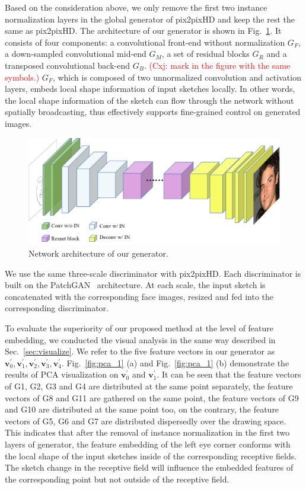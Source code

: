 \documentclass[10pt,twocolumn,letterpaper]{article}
\newcommand{\cxj}[1]{\textcolor{red}{(Cxj: #1)}}
\begin{document}
Based on the consideration above, we only remove the first two instance normalization layers in the global generator of pix2pixHD and keep the rest the same as pix2pixHD. 
The architecture of our generator is shown in Fig.~\ref{fig:our_generator}. 
It consists of four components: a convolutional front-end without normalization $G_F$, a down-sampled convolutional mid-end $G_M$, a set of residual blocks $G_R$ and a transposed convolutional back-end $G_B$. 
\cxj{mark in the figure with the same symbols.}
$G_F$, which is composed of two unnormalized convolution and activation layers,  embeds local shape information of input sketches locally.
In other words, the local shape information of the sketch can flow through the network without spatially broadcasting, thus effectively supports fine-grained control on generated images. 

\begin{figure}[htbp]
	\centering
	\includegraphics[width=\columnwidth]{our_model_G.png}
	\caption{Network architecture of our generator. }
	\label{fig:our_generator}
\end{figure}

We use the same three-scale discriminator with pix2pixHD. 
Each discriminator is built on the PatchGAN~\cite{pix2pix} architecture. 
At each scale, the input sketch is concatenated with the corresponding face images, resized and fed into the corresponding discriminator.
 
 
To evaluate the superiority of our proposed method at the level of feature embedding, we conducted the visual analysis in the same way described in Sec.~\ref{sec:visualize}.
%
We refer to the five feature vectors in our generator as $\boldsymbol{v}_0^{'},\boldsymbol{v}_1^{'},\boldsymbol{v}_2^{'},\boldsymbol{v}_3^{'},\boldsymbol{v}_4^{'}$.
%
Fig.~\ref{fig:pca_1} (a) and Fig.~\ref{fig:pca_1} (b) demonstrate the results of PCA visualization on $\boldsymbol{v}_0^{'}$ and $\boldsymbol{v}_1^{'}$. 
It can be seen that the feature vectors of G1, G2, G3 and G4 are distributed at the same point separately, the feature vectors of G8 and G11 are gathered on the same point, the feature vectors of G9 and G10 are distributed at the same point too, on the contrary, the feature vectors of G5, G6 and G7 are distributed dispersedly over the drawing space. 
This indicates that after the removal of instance normalization in the first two layers of generator, the feature embedding of the left eye corner conforms with the local shape of the input sketches inside of the corresponding receptive fields. 
The sketch change in the receptive field will influence the embedded features of the corresponding point but not outside of the receptive field.
\end{document}
